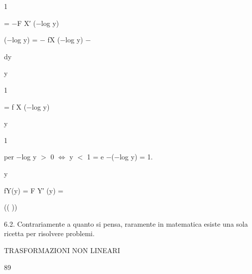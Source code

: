\documentclass[a4paper,portrait,12pt]{article}
\begin{document}
1


\begin{flushleft}
= $-$F X′ ($-$log y)
\end{flushleft}


\begin{flushleft}
($-$log y) = $-$ fX ($-$log y) $-$
\end{flushleft}


\begin{flushleft}
dy
\end{flushleft}


\begin{flushleft}
y
\end{flushleft}


1


\begin{flushleft}
= f X ($-$log y)
\end{flushleft}


\begin{flushleft}
y
\end{flushleft}


1


\begin{flushleft}
per $-$log y $>$ 0 $\Leftrightarrow$ y $<$ 1 = e $-$($-$log y) = 1.
\end{flushleft}


\begin{flushleft}
y
\end{flushleft}


\begin{flushleft}
fY(y) = F Y′ (y) =
\end{flushleft}





(( ))





\begin{flushleft}
6.2. Contrariamente a quanto si pensa, raramente in matematica esiste una sola ricetta per risolvere problemi.
\end{flushleft}





\begin{flushleft}
 TRASFORMAZIONI NON LINEARI
\end{flushleft}





89
\end{document}
